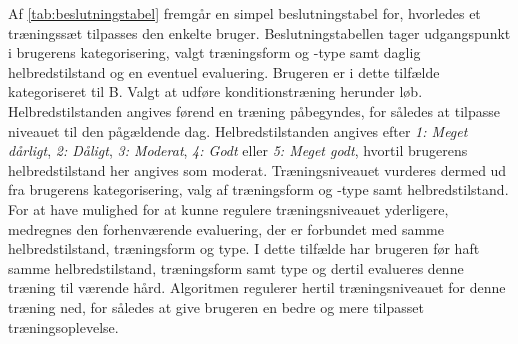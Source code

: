\noindent
Af \autoref{tab:beslutningstabel} fremgår en simpel beslutningstabel for, hvorledes et træningssæt tilpasses den enkelte bruger. Beslutningstabellen tager udgangspunkt i brugerens kategorisering, valgt træningsform og -type samt daglig helbredstilstand og en eventuel evaluering. Brugeren er i dette tilfælde kategoriseret til B. Valgt at udføre konditionstræning herunder løb. Helbredstilstanden angives førend en træning påbegyndes, for således at tilpasse niveauet til den pågældende dag. Helbredstilstanden angives efter \textit{1: Meget dårligt}, \textit{2: Dåligt}, \textit{3: Moderat}, \textit{4: Godt} eller \textit{5: Meget godt}, hvortil brugerens helbredstilstand her angives som moderat.
Træningsniveauet vurderes dermed ud fra brugerens kategorisering, valg af træningsform og -type samt helbredstilstand. 
For at have mulighed for at kunne regulere træningsniveauet yderligere, medregnes den forhenværende evaluering, der er forbundet med samme helbredstilstand, træningsform og type. I dette tilfælde har brugeren før haft samme helbredstilstand, træningsform samt type og dertil evalueres denne træning til værende hård. Algoritmen regulerer hertil træningsniveauet for denne træning ned, for således at give brugeren en bedre og mere tilpasset træningsoplevelse. 
